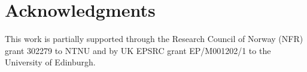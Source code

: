 





\section*{Acknowledgments}
This work is partially supported through the Research Council of Norway (NFR) grant 302279 to NTNU and by UK EPSRC grant EP/M001202/1 to the University of Edinburgh.